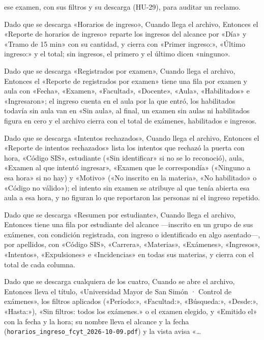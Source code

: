 {      ese examen, con sus filtros y su descarga (HU-29), para auditar un reclamo.
\item Dado que se descarga «Horarios de ingreso», Cuando llega el archivo, Entonces el
      «Reporte de horarios de ingreso» reparte los ingresos del alcance por «Día» y
      «Tramo de 15 min» con su cantidad, y cierra con «Primer ingreso:», «Último
      ingreso:» y el total; sin ingresos, el primero y el último dicen «ninguno».
\item Dado que se descarga «Registrados por examen», Cuando llega el archivo, Entonces
      el «Reporte de registrados por examen» tiene una fila por examen y aula con
      «Fecha», «Examen», «Facultad», «Docente», «Aula», «Habilitados» e «Ingresaron»; el
      ingreso cuenta en el aula por la que entró, los habilitados todavía sin aula van
      en «Sin aula», al final, un examen sin aulas ni habilitados figura en cero y el
      archivo cierra con el total de exámenes, habilitados e ingresos.
\item Dado que se descarga «Intentos rechazados», Cuando llega el archivo, Entonces el
      «Reporte de intentos rechazados» lista los intentos que rechazó la puerta con
      hora, «Código SIS», estudiante («Sin identificar» si no se lo reconoció), aula,
      «Examen al que intentó ingresar», «Examen que le correspondía» («Ninguno a esa
      hora» si no hay) y «Motivo» («No inscrito en la materia», «No habilitado» o
      «Código no válido»); el intento sin examen se atribuye al que tenía abierta esa
      aula a esa hora, y no figuran lo que reportaron las personas ni el ingreso
      repetido.
\item Dado que se descarga «Resumen por estudiante», Cuando llega el archivo, Entonces
      tiene una fila por estudiante del alcance ---inscrito en un grupo de sus exámenes,
      con condición registrada, con ingreso o identificado en algo asentado---, por
      apellidos, con «Código SIS», «Carrera», «Materias», «Exámenes», «Ingresos»,
      «Intentos», «Expulsiones» e «Incidencias» en todas sus materias, y cierra con el
      total de cada columna.
\item Dado que se descarga cualquiera de los cuatro, Cuando se abre el archivo, Entonces
      lleva el título, «Universidad Mayor de San Simón · Control de exámenes»,
      los filtros aplicados («Período:», «Facultad:», «Búsqueda:», «Desde:», «Hasta:»),
      «Sin filtros: todos los exámenes.» o el examen elegido, y «Emitido el» con la
      fecha y la hora; su nombre lleva el alcance y la fecha
      (\texttt{horarios\_ingreso\_fcyt\_2026-10-09.pdf}) y la vista avisa «\ldots{}
}
